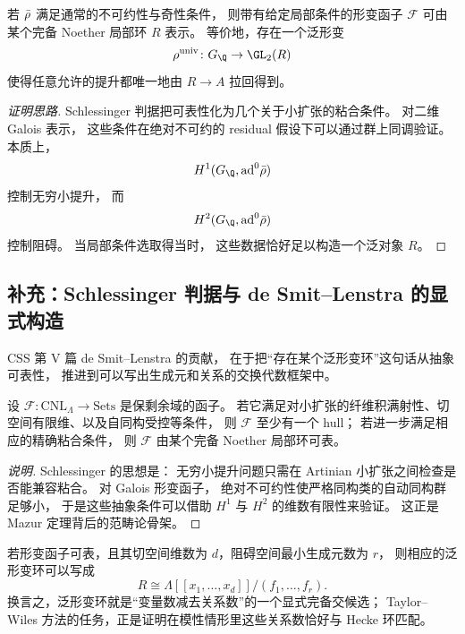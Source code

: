 \begin{theorem}
\label{thm:ch10-mazur}
若 $\bar{\rho}$ 满足通常的不可约性与奇性条件，
则带有给定局部条件的形变函子 $\mathcal F$ 可由某个完备 Noether 局部环 $R$ 表示。
等价地，存在一个泛形变
\[
  \rho^{\mathrm{univ}}\colon G_\Q\to \GL_2(R)
\]
使得任意允许的提升都唯一地由 $R\to A$ 拉回得到。
\end{theorem}

\begin{proof}[证明思路]
Schlessinger 判据把可表性化为几个关于小扩张的粘合条件。
对二维 Galois 表示，
这些条件在绝对不可约的 residual 假设下可以通过群上同调验证。
本质上，
\[
  H^1(G_\Q,\mathrm{ad}^0\rhobar)
\]
控制无穷小提升，
而
\[
  H^2(G_\Q,\mathrm{ad}^0\rhobar)
\]
控制阻碍。
当局部条件选取得当时，
这些数据恰好足以构造一个泛对象 $R$。
\end{proof}

\subsection*{补充：Schlessinger 判据与 de Smit--Lenstra 的显式构造}
CSS 第 V 篇 de Smit--Lenstra 的贡献，
在于把“存在某个泛形变环”这句话从抽象可表性，
推进到可以写出生成元和关系的交换代数框架中。

\begin{theorem}
\label{thm:ch10-schlessinger}
设 $\mathcal F\colon \mathrm{CNL}_\Lambda\to \mathrm{Sets}$ 是保剩余域的函子。
若它满足对小扩张的纤维积满射性、切空间有限维、以及自同构受控等条件，
则 $\mathcal F$ 至少有一个 hull；
若进一步满足相应的精确粘合条件，
则 $\mathcal F$ 由某个完备 Noether 局部环可表。
\end{theorem}

\begin{proof}[说明]
Schlessinger 的思想是：
无穷小提升问题只需在 Artinian 小扩张之间检查是否能兼容粘合。
对 Galois 形变函子，
绝对不可约性使严格同构类的自动同构群足够小，
于是这些抽象条件可以借助 $H^1$ 与 $H^2$ 的维数有限性来验证。
这正是 Mazur 定理背后的范畴论骨架。
\end{proof}

\begin{proposition}
\label{prop:ch10-desmit-lenstra}
若形变函子可表，且其切空间维数为 $d$，阻碍空间最小生成元数为 $r$，
则相应的泛形变环可以写成
\[
  R\cong \Lambda[[x_1,\dots,x_d]]/(f_1,\dots,f_r).
\]
换言之，泛形变环就是“变量数减去关系数”的一个显式完备交候选；
Taylor--Wiles 方法的任务，正是证明在模性情形里这些关系数恰好与 Hecke 环匹配。
\end{proposition}


